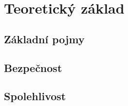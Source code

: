 \chapter{Teoretický základ}
\label{sec:te}

\section{Základní pojmy}

\section{Bezpečnost}

\section{Spolehlivost}